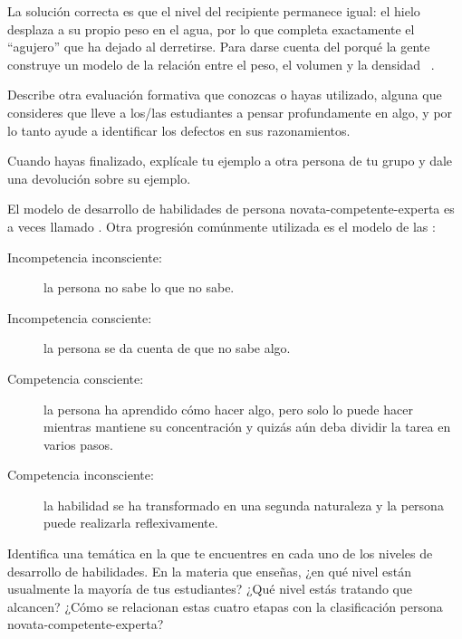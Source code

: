 
La solución correcta es que el nivel del recipiente permanece igual:
el hielo desplaza a su propio peso en el agua,
por lo que completa exactamente el ``agujero'' que ha dejado al derretirse.
Para darse cuenta del porqué la gente construye un modelo de la relación entre el peso, el volumen y la densidad ~\cite{Epst2002}.

Describe otra evaluación formativa que conozcas o hayas utilizado,
alguna que consideres que lleve a los/las estudiantes a pensar profundamente en algo,
y por lo tanto ayude a identificar los defectos en sus razonamientos.

Cuando hayas finalizado,
explícale tu ejemplo a otra persona de tu grupo
y dale una devolución sobre su ejemplo.

El modelo de desarrollo de habilidades de persona novata-competente-experta
es a veces llamado
.
Otra progresión comúnmente utilizada es el modelo de las :

\begin{description}

\item[Incompetencia inconsciente:]
  la persona no sabe lo que no sabe.

\item[Incompetencia consciente:]
  la persona se da cuenta de que no sabe algo.

\item[Competencia consciente:]
la persona ha aprendido cómo hacer algo,
pero solo lo puede hacer mientras mantiene su concentración
y quizás aún deba dividir la tarea en varios pasos.

\item[Competencia inconsciente:]
  la habilidad se ha transformado en una segunda naturaleza
y la persona puede realizarla reflexivamente.

\end{description}

Identifica una temática en la que te encuentres en cada uno de los niveles de desarrollo de habilidades.
En la materia que enseñas, ¿en qué nivel están usualmente la mayoría de tus estudiantes?
¿Qué nivel estás tratando que alcancen?
¿Cómo se relacionan estas cuatro etapas con la clasificación persona novata-competente-experta?


